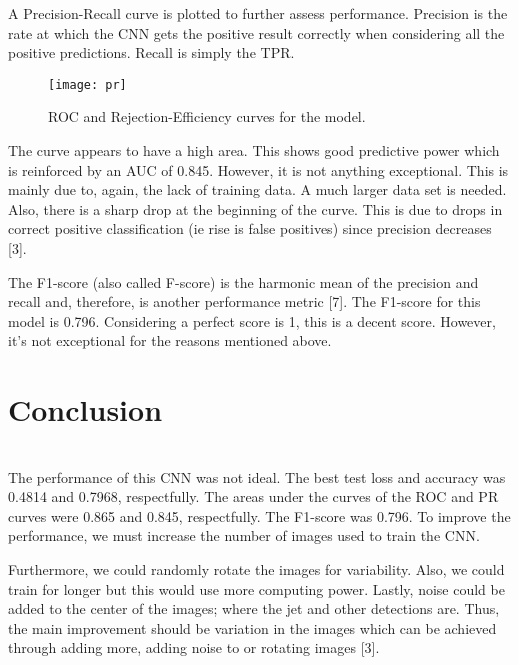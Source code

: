 \documentclass[11pt, a4page]{article}
\begin{document}
A Precision-Recall curve is plotted to further assess performance. Precision is the rate at which the CNN gets the positive result correctly when considering all the positive predictions. Recall is simply the TPR. 

\begin{figure}[!ht]
    \centering
    \texttt{[image: pr]}
    \caption{ROC and Rejection-Efficiency curves for the model. }
    \label{nothing}
\end{figure}



The curve appears to have a high area. This shows good predictive power which is reinforced by an AUC of 0.845. However, it is not anything exceptional. This is mainly due to, again, the lack of training data. A much larger data set is needed. Also, there is a sharp drop at the beginning of the curve. This is due to drops in correct positive classification (ie rise is false positives) since precision decreases [3]. 

The F1-score (also called F-score) is the harmonic mean of the precision and recall and, therefore, is another performance metric [7]. The F1-score for this model is 0.796. Considering a perfect score is 1, this is a decent score. However, it's not exceptional for the reasons mentioned above.




\pagebreak

\section{Conclusion}
\\

The performance of this CNN was not ideal. The best test loss and accuracy was 0.4814 and 0.7968, respectfully. The areas under the curves of the ROC and PR curves were 0.865 and 0.845, respectfully. The F1-score was 0.796. To improve the performance, we must increase the number of images used to train the CNN. 

Furthermore, we could randomly rotate the images for variability. Also, we could train for longer but this would use more computing power. Lastly, noise could be added to the center of the images; where the jet and other detections are. Thus, the main improvement should be variation in the images which can be achieved through adding more, adding noise to or rotating images [3].


\pagebreak
\end{document}
